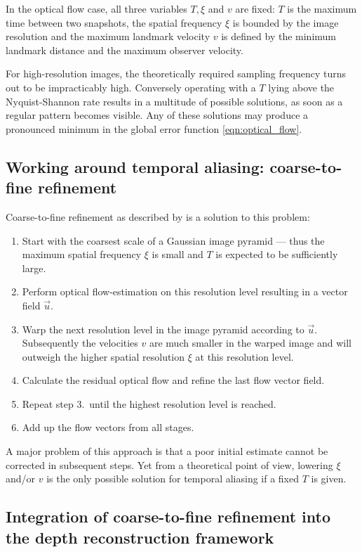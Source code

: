 In the optical flow case, all three variables $T, \xi$ and $v$ are fixed: $T$ is the maximum time between two snapshots, the spatial frequency $\xi$ is bounded by the image resolution and the maximum landmark velocity $v$ is defined by the minimum landmark distance and the maximum observer velocity.

For high-resolution images, the theoretically required sampling frequency turns out to be impracticably high. Conversely operating with a $T$ lying above the Nyquist-Shannon rate results in a multitude of possible solutions, as soon as a regular pattern becomes visible. Any of these solutions may produce a pronounced minimum in the global error function \ref{eqn:optical_flow}.

\subsection{Working around temporal aliasing: coarse-to-fine refinement}

Coarse-to-fine refinement as described by \citet[p. 254f., section ``Temporal Aliasing and Coarse-To-Fine Refinement'']{flowchapter05} is a solution to this problem:
\begin{enumerate}[1.]
 \item Start with the coarsest scale of a Gaussian image pyramid --- thus the maximum spatial frequency $\xi$ is small and $T$ is expected to be sufficiently large.
 \item Perform optical flow-estimation on this resolution level resulting in a vector field $\vec u$.
 \item Warp the next resolution level in the image pyramid according to $\vec u$. Subsequently the velocities $v$ are much smaller in the warped image and will outweigh the higher spatial resolution $\xi$ at this resolution level.
 \item Calculate the residual optical flow and refine the last flow vector field.
 \item Repeat step 3.\ until the highest resolution level is reached.
 \item Add up the flow vectors from all stages.
\end{enumerate}
A major problem of this approach is that a poor initial estimate cannot be corrected in subsequent steps. Yet from a theoretical point of view, lowering $\xi$ and/or $v$ is the only possible solution for temporal aliasing if a fixed $T$ is given.

\subsection{Integration of coarse-to-fine refinement into the depth reconstruction framework}

